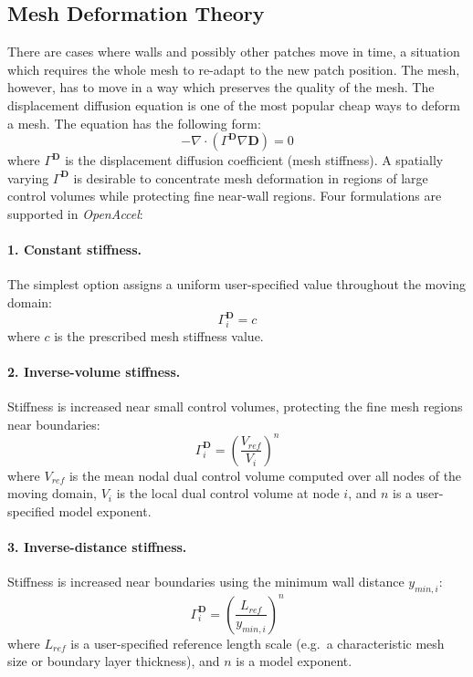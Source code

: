 \documentclass[12pt]{extarticle}
\newcommand{\<}{\langle}
\renewcommand{\>}{\rangle}
\theoremstyle{definition}
\begin{document}
\subsection{Mesh Deformation Theory}

There are cases where walls and possibly other patches move in time, a situation which requires the whole mesh to re-adapt to the new patch position. The mesh, however, has to move in a way which preserves the quality of the mesh. The displacement diffusion equation is one of the most popular cheap ways to deform a mesh. The equation has the following form:
\begin{equation}
    -\nabla \cdot \left( \Gamma^{\textbf{D}} \nabla \textbf{D} \right ) = 0
\end{equation}
where $\Gamma^{\textbf{D}}$ is the displacement diffusion coefficient (mesh stiffness). A spatially varying $\Gamma^{\textbf{D}}$ is desirable to concentrate mesh deformation in regions of large control volumes while protecting fine near-wall regions. Four formulations are supported in \textit{OpenAccel}:

\paragraph{1. Constant stiffness.}
The simplest option assigns a uniform user-specified value throughout the moving domain:
\begin{equation}
    \Gamma^{\textbf{D}}_i = c
\end{equation}
where $c$ is the prescribed mesh stiffness value.

\paragraph{2. Inverse-volume stiffness.}
Stiffness is increased near small control volumes, protecting the fine mesh regions near boundaries:
\begin{equation}
    \Gamma^{\textbf{D}}_i = \left(\frac{V_{ref}}{V_i}\right)^n
\end{equation}
where $V_{ref}$ is the mean nodal dual control volume computed over all nodes of the moving domain, $V_i$ is the local dual control volume at node $i$, and $n$ is a user-specified model exponent.

\paragraph{3. Inverse-distance stiffness.}
Stiffness is increased near boundaries using the minimum wall distance $y_{min,i}$:
\begin{equation}
    \Gamma^{\textbf{D}}_i = \left(\frac{L_{ref}}{y_{min,i}}\right)^n
\end{equation}
where $L_{ref}$ is a user-specified reference length scale (e.g.\ a characteristic mesh size or boundary layer thickness), and $n$ is a model exponent.
\end{document}
